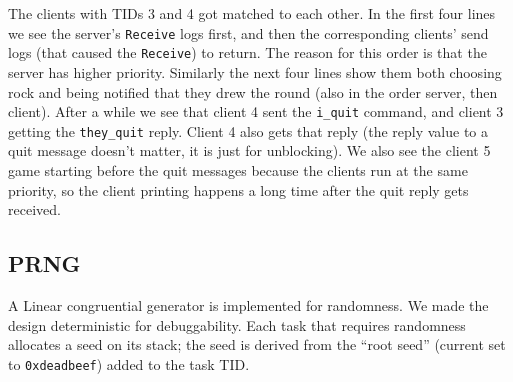 \documentclass{article}
\begin{document}
The clients with TIDs 3 and 4 got matched to each other. In the first four lines we see the server's \texttt{Receive} logs first, and then the corresponding clients' send logs (that caused the \texttt{Receive}) to return. The reason for this order is that the server has higher priority. Similarly the next four lines show them both choosing rock and being notified that they drew the round (also in the order server, then client). After a while we see that client 4 sent the \texttt{i\_quit} command, and client 3 getting the \texttt{they\_quit} reply. Client 4 also gets that reply (the reply value to a quit message doesn't matter, it is just for unblocking). We also see the client 5 game starting before the quit messages because the clients run at the same priority, so the client printing happens a long time after the quit reply gets received.

\subsection*{PRNG}

A Linear congruential generator is implemented for randomness. We made the design deterministic for debuggability. Each task that requires randomness allocates a seed on its stack; the seed is derived from the ``root seed'' (current set to \texttt{0xdeadbeef}) added to the task TID.
\end{document}
